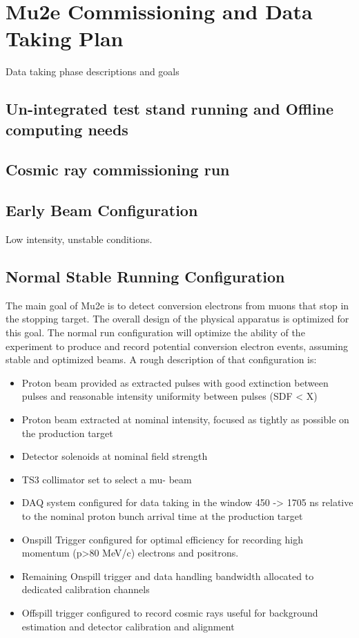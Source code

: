 \section{Mu2e Commissioning and Data Taking Plan}
\label{sec:runplan}
Data taking phase descriptions and goals
\subsection{Un-integrated test stand running and Offline computing needs}
\subsection{Cosmic ray commissioning run}

\subsection{Early Beam Configuration}
Low intensity, unstable conditions.



\subsection{ Normal Stable Running Configuration}

The main goal of Mu2e is to detect conversion electrons from muons that stop in the stopping target.  The overall design of the physical apparatus is optimized for this goal.  The normal run configuration will optimize the ability of the experiment to produce and record potential conversion electron events, assuming stable and optimized beams.  A rough description of that configuration is:
\begin{itemize}
  \item Proton beam provided as extracted pulses with good extinction between pulses and reasonable intensity uniformity between pulses (SDF < X)
  \item Proton beam extracted at nominal intensity, focused as tightly as possible on the production target
  \item Detector solenoids at nominal field strength
  \item TS3 collimator set to select a mu- beam
  \item DAQ system configured for data taking in the window 450 -> 1705 ns relative to the nominal proton bunch arrival time at the production target
  \item Onspill Trigger configured for optimal efficiency for recording high momentum (p>80 MeV/c) electrons and positrons.
  \item Remaining Onspill trigger and data handling bandwidth allocated to dedicated calibration channels
  \item Offspill trigger configured to record cosmic rays useful for background estimation and detector calibration and alignment
\end{itemize}

